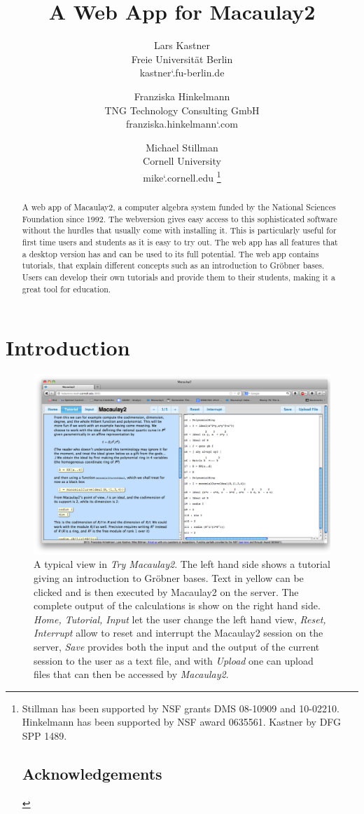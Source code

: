 \documentclass[]{article}
\title{A Web App for Macaulay2}
\author{Lars Kastner\\ Freie Universit\"at Berlin \\{\small kastner\char`\@math.fu-berlin.de} \and 
Franziska Hinkelmann\\TNG Technology Consulting GmbH \\{\small franziska.hinkelmann\char`\@tngtech.com} \and 
Michael Stillman\\Cornell University \\{\small mike\char`\@math.cornell.edu} \thanks{Stillman has been supported by NSF grants DMS 08-10909 and 10-02210. Hinkelmann has been supported by NSF award 0635561. Kastner by DFG SPP 1489. \section{Acknowledgements}
} }
\date{}
\def\tryM2{{\it Try Macaulay2}}
\def\M2{{\it Macaulay2}}
\begin{document}
\ifpdf
{}
\else
{}
\fi



\maketitle



\begin{abstract}

    A web app of Macaulay2, a computer algebra system funded by the
    National Sciences Foundation since 1992. The webversion gives easy
    access to this sophisticated software without the hurdles that
    usually come with installing it. This is particularly useful for
    first time users and students as it is easy to try out. The
    web app has all features that a desktop version has and can be
    used to its full potential. The web app contains tutorials,
    that explain different concepts such as an introduction to
    Gr\"obner bases. Users can develop their own tutorials and provide
    them to their students, making it a great tool for education.

\end{abstract}


\section{Introduction}
\begin{figure}[htb]
    \includegraphics[width=.95\textwidth]{homeWebsite.jpg}
    \caption{A typical view in \tryM2. The left hand
      side shows a tutorial giving an introduction to Gr\"obner
      bases. Text in yellow can be clicked and is then executed by
      Macaulay2 on the server. The complete output of the calculations
      is show on the right hand side. {\it Home, Tutorial, Input} let
      the user change the left hand view, {\it Reset, Interrupt} allow
      to reset and interrupt the Macaulay2 session on the server, {\it
        Save} provides both the input and the output of the current
      session to the user as a text file, and with {\it Upload} one
      can upload files that can then be accessed by \M2.}
    \label{fig:home}
\end{figure}
\end{document}
